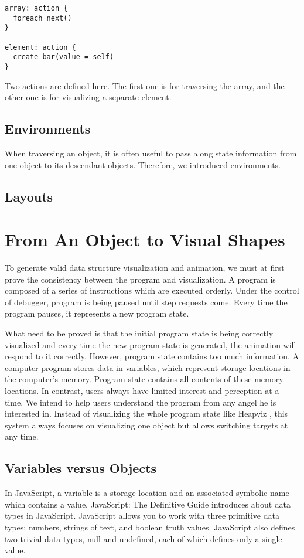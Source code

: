 \begin{lstlisting}
array: action {
  foreach_next()
}

element: action {
  create bar(value = self)
}
\end{lstlisting}

Two actions are defined here. The first one is for traversing the array, and the other one is for visualizing a separate element.

\subsection {Environments}
When traversing an object, it is often useful to pass along state information from one object to its descendant objects. Therefore, we introduced environments. 

\subsection {Layouts}

\section {From An Object to Visual Shapes}
To generate valid data structure visualization and animation, we must at first prove the consistency between the program and visualization. A program is composed of a series of instructions which are executed orderly. Under the control of debugger, program is being paused until step requests come. Every time the program pauses, it represents a new program state. 

What need to be proved is that the initial program state is being correctly visualized and every time the new program state is generated, the animation will respond to it correctly. However, program state contains too much information. A computer program stores data in variables, which represent storage locations in the computer's memory. Program state contains all contents of these memory locations. In contrast, users always have limited interest and perception at a time. We intend to help users understand the program from any angel he is interested in. Instead of visualizing the whole program state like Heapviz \cite{Aftandilian:2010:HIH:1879211.1879222}, this system always focuses on visualizing one object but allows switching targets at any time.

\subsection {Variables versus Objects}
In JavaScript, a variable is a storage location and an associated symbolic name which contains a value. JavaScript: The Definitive Guide \cite{Flanagan:1998:JDG:551216} introduces about data types in JavaScript. JavaScript allows you to work with three primitive data types: numbers, strings of text, and boolean truth values. JavaScript also defines two trivial data types, null and undefined, each of which defines only a single value.

